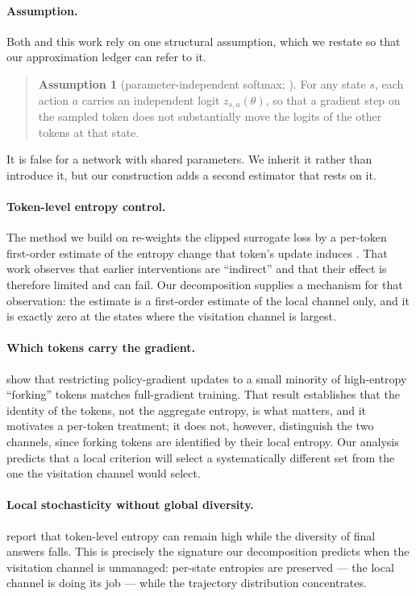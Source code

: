 \documentclass[11pt]{article}
\begin{document}
\paragraph{Assumption.}
Both \citet{steer} and this work rely on one structural assumption, which we restate
so that our approximation ledger can refer to it.

\begin{quote}
\textbf{Assumption 1} (parameter-independent softmax; \citealp{steer}).
\label{ass:indep}
For any state $s$, each action $a$ carries an independent logit $z_{s,a}(\theta)$, so
that a gradient step on the sampled token does not substantially move the logits of
the other tokens at that state.
\end{quote}

\noindent
It is false for a network with shared parameters. We inherit it rather than
introduce it, but our construction adds a second estimator that rests on it.

\paragraph{Token-level entropy control.}
The method we build on re-weights the clipped surrogate loss by a per-token
first-order estimate of the entropy change that token's update induces
\citep{steer}. That work observes that earlier interventions are ``indirect'' and
that their effect is therefore limited and can fail. Our decomposition supplies a
mechanism for that observation: the estimate is a first-order estimate of the local
channel only, and it is exactly zero at the states where the visitation channel is
largest.

\paragraph{Which tokens carry the gradient.}
\citet{wang2025dbeyond} show that restricting policy-gradient updates to a small
minority of high-entropy ``forking'' tokens matches full-gradient training. That
result establishes that the identity of the tokens, not the aggregate entropy,
is what matters, and it motivates a per-token treatment; it does not, however,
distinguish the two channels, since forking tokens are identified by their local
entropy. Our analysis predicts that a local criterion will select a systematically
different set from the one the visitation channel would select.

\paragraph{Local stochasticity without global diversity.}
\citet{wu2025ainvisible} report that token-level entropy can remain high while the
diversity of final answers falls. This is precisely the signature our decomposition
predicts when the visitation channel is unmanaged: per-state entropies are
preserved --- the local channel is doing its job --- while the trajectory
distribution concentrates.
\end{document}
